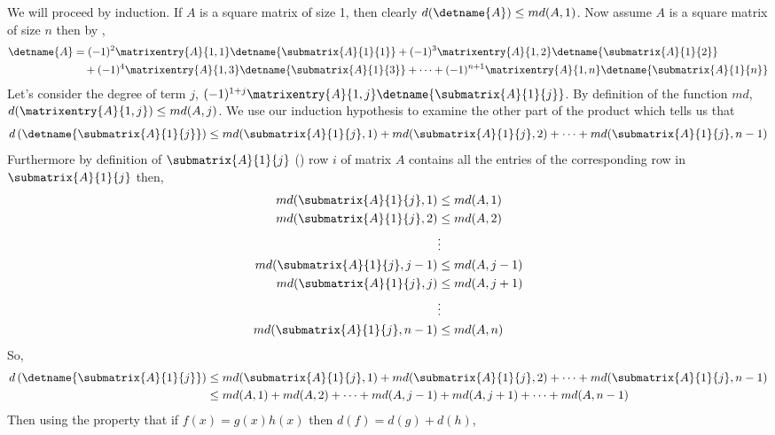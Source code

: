We will proceed by induction. If $A$ is a square matrix of size 1, then clearly $d(\detname{A}) \leq md(A,1)$. Now assume $A$ is a square matrix of size $n$ then by ,
%
\begin{align*}
\detname{A}&=
(-1)^{2}\matrixentry{A}{1,1}\detname{\submatrix{A}{1}{1}}+
(-1)^{3}\matrixentry{A}{1,2}\detname{\submatrix{A}{1}{2}}\\
&\quad+
(-1)^{4}\matrixentry{A}{1,3}\detname{\submatrix{A}{1}{3}}+
\cdots+
(-1)^{n+1}\matrixentry{A}{1,n}\detname{\submatrix{A}{1}{n}}
\end{align*}
%
Let's consider the degree of term $j$, $(-1)^{1+j}\matrixentry{A}{1,j}\detname{\submatrix{A}{1}{j}}$. By definition of the function $md$, $d(\matrixentry{A}{1,j})\leq md(A,j)$. We use our induction hypothesis to examine the other part of the product which tells us that
%
\begin{align*}
d\left(\detname{\submatrix{A}{1}{j}}\right) 
&\leq md(\submatrix{A}{1}{j},1)+md(\submatrix{A}{1}{j},2)+\cdots+md(\submatrix{A}{1}{j},n-1) \\
\end{align*}
%
Furthermore by definition of $\submatrix{A}{1}{j}$ () row $i$ of matrix $A$ contains all the entries of the corresponding row in $\submatrix{A}{1}{j}$ then,  
%
\begin{align*}
md(\submatrix{A}{1}{j},1) &\leq md(A,1) \\
md(\submatrix{A}{1}{j},2) &\leq md(A,2) \\
&\vdots \\
md(\submatrix{A}{1}{j},j-1) &\leq md(A,j-1) \\
md(\submatrix{A}{1}{j},j) &\leq md(A,j+1) \\
&\vdots \\
md(\submatrix{A}{1}{j},n-1) &\leq md(A,n)
\end{align*}
%
So,
%
\begin{align*}
d\left(\detname{\submatrix{A}{1}{j}} \right)
&\leq md(\submatrix{A}{1}{j},1)+md(\submatrix{A}{1}{j},2)+\cdots+md(\submatrix{A}{1}{j},n-1) \\
&\leq md(A,1)+md(A,2)+\cdots+md(A,j-1)+md(A,j+1)+\cdots+md(A,n-1)
\end{align*}
%
Then using the property that if $f(x)=g(x)h(x)$ then $d(f)=d(g)+d(h)$,
